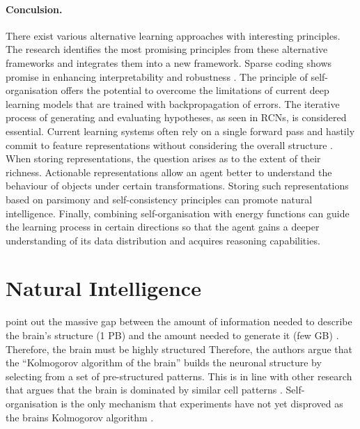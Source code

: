 \paragraph{Conculsion.} There exist various alternative learning approaches with interesting principles. The research identifies the most promising principles from these alternative frameworks and integrates them into a new framework. Sparse coding shows promise in enhancing interpretability and robustness . The principle of self-organisation offers the potential to overcome the limitations of current deep learning models that are trained with backpropagation of errors. The iterative process of generating and evaluating hypotheses, as seen in RCNs, is considered essential. Current learning systems often rely on a single forward pass and hastily commit to feature representations without considering the overall structure . When storing representations, the question arises as to the extent of their richness. Actionable representations allow an agent better to understand the behaviour of objects under certain transformations. Storing such representations based on parsimony and self-consistency principles can promote natural intelligence. Finally, combining self-organisation with energy functions can guide the learning process in certain directions so that the agent gains a deeper understanding of its data distribution and acquires reasoning capabilities.









\section{Natural Intelligence}
 point out the massive gap between the amount of information needed to describe the brain's structure (1 PB) and the amount needed to generate it (few GB) . Therefore, the brain must be highly structured \cite{gazzaniga_organization_1989, ackerman_discovering_1992, bassett_understanding_2011}
Therefore, the authors argue that the ``Kolmogorov algorithm  of the brain'' builds the neuronal structure by selecting from a set of pre-structured patterns. This is in line with other research that argues that the brain is dominated by similar cell patterns \cite{mountcastle_organizing_1978, mountcastle_columnar_1997}.
Self-organisation is the only mechanism that experiments have not yet disproved as the brains Kolmogorov algorithm \cite{willshaw_how_1976, willshaw_marker_1979, singer_brain_1986, kelso_selforganizing_1995, kelso_dynamic_1999}.

